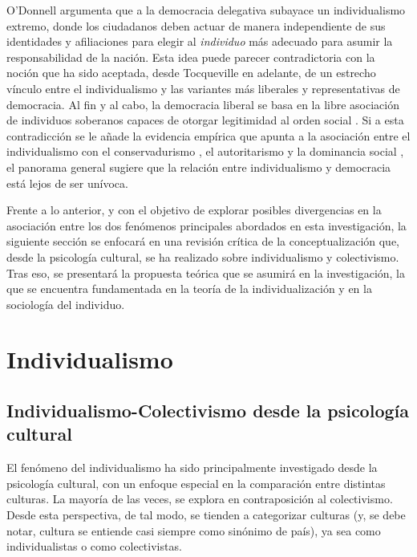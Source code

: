 \documentclass[12pt,twoside]{templates/facsothesis}
\begin{document}
O'Donnell \citeyearpar{odonnell1994} argumenta que a la democracia delegativa subayace un individualismo extremo, donde los ciudadanos deben actuar de manera independiente de sus identidades y afiliaciones para elegir al \emph{individuo} más adecuado para asumir la responsabilidad de la nación. Esta idea puede parecer contradictoria con la noción que ha sido aceptada, desde Tocqueville en adelante, de un estrecho vínculo entre el individualismo y las variantes más liberales y representativas de democracia. Al fin y al cabo, la democracia liberal se basa en la libre asociación de individuos soberanos capaces de otorgar legitimidad al orden social \citep{martuccelli2010}. Si a esta contradicción se le añade la evidencia empírica que apunta a la asociación entre el individualismo con el conservadurismo \citep{zhang2009}, el autoritarismo \citep{kemmelmeier2003} y la dominancia social \citep{strunk1999}, el panorama general sugiere que la relación entre individualismo y democracia está lejos de ser unívoca.

Frente a lo anterior, y con el objetivo de explorar posibles divergencias en la asociación entre los dos fenómenos principales abordados en esta investigación, la siguiente sección se enfocará en una revisión crítica de la conceptualización que, desde la psicología cultural, se ha realizado sobre individualismo y colectivismo. Tras eso, se presentará la propuesta teórica que se asumirá en la investigación, la que se encuentra fundamentada en la teoría de la individualización y en la sociología del individuo.

\hypertarget{individualismo}{%
\section{Individualismo}\label{individualismo}}

\hypertarget{individualismo-colectivismo-desde-la-psicologuxeda-cultural}{%
\subsection*{Individualismo-Colectivismo desde la psicología cultural}\label{individualismo-colectivismo-desde-la-psicologuxeda-cultural}}

El fenómeno del individualismo ha sido principalmente investigado desde la psicología cultural, con un enfoque especial en la comparación entre distintas culturas. La mayoría de las veces, se explora en contraposición al colectivismo. Desde esta perspectiva, de tal modo, se tienden a categorizar culturas (y, se debe notar, cultura se entiende casi siempre como sinónimo de país), ya sea como individualistas o como colectivistas.
\end{document}
